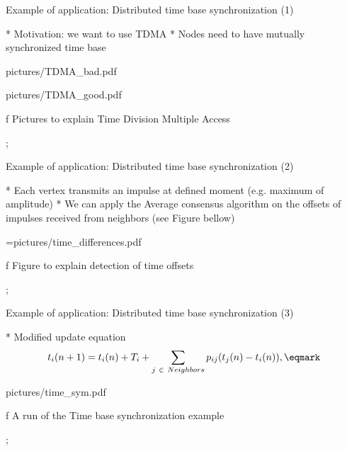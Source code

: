 


\sec Example of application: \nl  Distributed time base synchronization (1)



* Motivation: we want to use TDMA
* Nodes need to have mutually synchronized time base



\centerline{\picw=11cm \inspic pictures/TDMA_bad.pdf } 
\centerline{\picw=11cm \inspic pictures/TDMA_good.pdf } 
\caption/f Pictures to explain Time Division Multiple Access

\pg;






\sec Example of application: \nl  Distributed time base synchronization  (2)

* Each vertex transmits an impulse at defined moment (e.g. maximum of amplitude)
* We can apply the Average consensus algorithm  on the offsets of impulses received from neighbors (see Figure bellow) 


\centerline{\picw=\hsize \inspic pictures/time_differences.pdf } 
\caption/f Figure to explain detection of time offsets

\pg;





\sec Example of application: \nl  Distributed time base synchronization (3)

* Modified update equation
$$ t_i(n+1) = t_i(n)+T_i+ \sum_{j \ \in  \ Neighbors} p_{ij}(t_j(n) - t_i(n)), \eqmark$$

\centerline{\hsize \inspic pictures/time_sym.pdf }

\caption/f A run of the Time base synchronization example




\pg;



